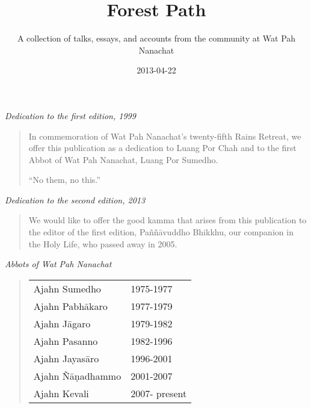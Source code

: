 \documentclass[
  pagePreset=largepage,
  babelLanguage=british,
]{aruno-anecdote}
\title{Forest Path}
\subtitle{A collection of talks, essays, and accounts from the community at Wat Pah Nanachat}
\author{}
\date{2013-04-22}
\begin{document}

\frontmatter


\cleartorecto
\thispagestyle{empty}



\cleartoverso
\thispagestyle{empty}



\cleartorecto
\thispagestyle{empty}



\cleartoverso
\thispagestyle{empty}
\vspace*{4\baselineskip}

\emph{Dedication to the first edition, 1999}

\begin{quote}
In commemoration of Wat Pah Nanachat's twenty-fifth Rains Retreat, we
offer this publication as a dedication to Luang Por Chah and to the
first Abbot of Wat Pah Nanachat, Luang Por Sumedho.
\bigskip

``No them, no this.''
\end{quote}

\vspace*{2\baselineskip}
\emph{Dedication to the second edition, 2013}

\begin{quote}
We would like to offer the good kamma that arises from this publication
to the editor of the first edition, Paññāvuddho Bhikkhu, our companion
in the Holy Life, who passed away in 2005.
\end{quote}

\clearpage
\thispagestyle{empty}
\vspace*{4\baselineskip}

\emph{Abbots of Wat Pah Nanachat}

\begin{quote}
\begin{tabular}{l l}
Ajahn Sumedho & 1975-1977\\
Ajahn Pabhākaro & 1977-1979\\
Ajahn Jāgaro & 1979-1982\\
Ajahn Pasanno & 1982-1996\\
Ajahn Jayasāro & 1996-2001\\
Ajahn Ñāṇadhammo & 2001-2007\\
Ajahn Kevali & 2007- present\\
\end{tabular}
\end{quote}
\end{document}
